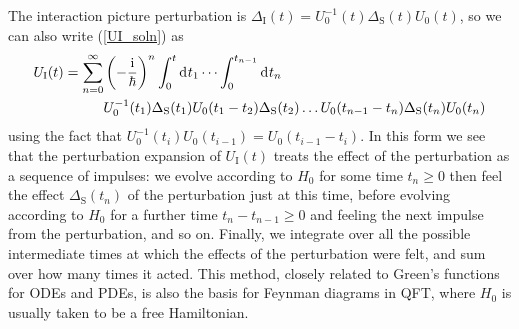 \documentclass{article}
\theoremstyle{plain}\theoremheaderfont{\normalfont\itshape}\theorembodyfont{\rmfamily}\theoremseparator{.}\newtheorem*{rem}{Remark}\newtheorem*{ex}{Example}\newtheorem*{proof}{Proof}\newtheorem*{altp}{Alternative proof}
\theoremstyle{plain}\theoremheaderfont{\normalfont\bfseries}\theorembodyfont{\rmfamily}\theoremseparator{.}\newtheorem{thm}{Theorem}[section]\newtheorem{lem}[thm]{Lemma}\newtheorem{prop}[thm]{Proposition}\newtheorem*{cor}{Corollary}\newtheorem{defn}[thm]{Definition}\newtheorem{clm}[thm]{Claim}\newtheorem{clminproof}{Claim}
\theoremstyle{break}\theoremheaderfont{\normalfont\itshape}\theorembodyfont{\rmfamily}\theoremseparator{.\medskip}\newtheorem*{proofskip}{Proof}\newtheorem*{exs}{Examples}\newtheorem*{rems}{Remarks}
\theoremstyle{break}\theoremheaderfont{\normalfont\bfseries}\theorembodyfont{\rmfamily}\theoremseparator{.\medskip}\newtheorem{lemskip}[thm]{Lemma}\newtheorem{defnskip}[thm]{Definition}\newtheorem{propskip}[thm]{Proposition}\newtheorem{thmskip}[thm]{Theorem}
\numberwithin{equation}{section}
\newcommand{\ii}{\mathrm{i}}
\newcommand{\dd}[2][]{\mathrm{d}^{#1} #2\,}
\renewcommand{\S}{_{\mathrm{S}}}
\newcommand{\I}{_{\mathrm{I}}}
\begin{document}
    The interaction picture perturbation is \(\Delta\I(t)=U_0^{-1}(t)\Delta\S(t)U_0(t)\), so we can also write (\ref{UI_soln}) as
    \begin{align}
        U\I(t)=\sum_{n=0}^{\infty}&\left(-\frac{\ii}{\hbar}\right)^n\int_{0}^{t}\dd{t_1}\dots\int_{0}^{t_{n-1}}\dd{t_{n}}\notag\\
        &U_0^{-1}(t_1)\Delta\S(t_1)U_{0}(t_1-t_2)\Delta\S(t_2)\dots U_0(t_{n-1}-t_n)\Delta\S(t_n)U_0(t_n)
    \end{align}
    using the fact that \(U_{0}^{-1}(t_i)U_0(t_{i-1})=U_0(t_{i-1}-t_i)\). In this form we see that the perturbation expansion of \(U\I(t)\) treats the effect of the perturbation as a sequence of impulses: we evolve according to \(H_0\) for some time \(t_n\ge 0\) then feel the effect \(\Delta\S(t_n)\) of the perturbation just at this time, before evolving according to \(H_0\) for a further time \(t_{n}-t_{n-1}\ge 0\) and feeling the next impulse from the perturbation, and so on. Finally, we integrate over all the possible intermediate times at which the effects of the perturbation were felt, and sum over how many times it acted. This method, closely related to Green's functions for ODEs and PDEs, is also the basis for Feynman diagrams in QFT, where \(H_0\) is usually taken to be a free Hamiltonian.
\end{document}
